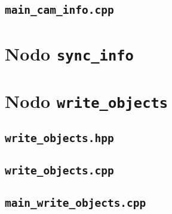 \subsection*{\texttt{main\_cam\_info.cpp}}

\vspace{0.2cm}

\vspace{0.4cm}

\section{Nodo \texttt{sync\_info}}

\lstset{style=pythonstyle}
\vspace{0.2cm}

\vspace{0.4cm}

\section{Nodo \texttt{write\_objects}}

\subsection*{\texttt{write\_objects.hpp}}

\lstset{style=cppstyle}
\vspace{0.2cm}

\vspace{0.4cm}

\subsection*{\texttt{write\_objects.cpp}}

\vspace{0.2cm}

\vspace{0.4cm}

\subsection*{\texttt{main\_write\_objects.cpp}}

\vspace{0.2cm}

\vspace{0.4cm}

\printbibliography


